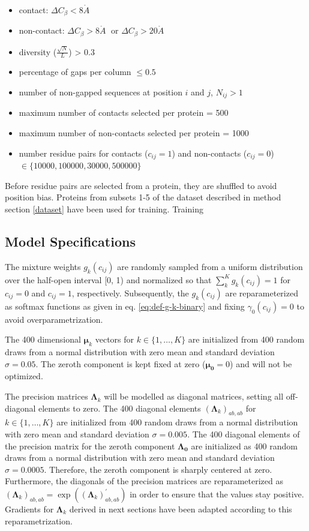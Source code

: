 \documentclass[11pt,a4paper,twoside]{book}
\providecommand{\tightlist}{%
  \setlength{\itemsep}{0pt}\setlength{\parskip}{0pt}}
\newcommand{\Cb}{C_\beta}
\newcommand{\eq}{\!=\!}
\newcommand{\Lk}{\mathbf{\Lambda}_k}
\newcommand{\muk}{\mathbf{\mu}_k}
\newcommand{\cij}{c_{ij}}
\newcommand{\angstrom}{\mathring{A} \;}
\theoremstyle{definition}
\theoremstyle{definition}
\theoremstyle{remark}
\begin{document}
\begin{itemize}
\tightlist
\item
  contact: \(\Delta\Cb <8 \angstrom\)
\item
  non-contact: \(\Delta\Cb >8 \angstrom\) or \(\Delta\Cb >20 \angstrom\)
\item
  diversity (\(\frac{\sqrt{N}}{L}\)) \textgreater{} 0.3
\item
  percentage of gaps per column \(\leq 0.5\)
\item
  number of non-gapped sequences at position \(i\) and \(j\),
  \(N_{ij} > 1\)
\item
  maximum number of contacts selected per protein = 500
\item
  maximum number of non-contacts selected per protein = 1000
\item
  number residue pairs for contacts (\(\cij \eq 1\)) and non-contacts
  (\(\cij \eq 0\)) \(\in \{10000, 100000, 30000, 500000 \}\)
\end{itemize}

Before residue pairs are selected from a protein, they are shuffled to
avoid position bias. Proteins from subsets 1-5 of the dataset described
in method section \ref{dataset} have been used for training. Training

\subsection{Model
Specifications}\label{model-specifications-training-hyperparmeters}

The mixture weights \(g_k(\cij)\) are randomly sampled from a uniform
distribution over the half-open interval {[}0, 1) and normalized so that
\(\sum_k^K g_k(\cij) = 1\) for \(\cij=0\) and \(\cij=1\), respectively.
Subsequently, the \(g_k(\cij)\) are reparameterized as softmax functions
as given in eq. \eqref{eq:def-g-k-binary} and fixing \(\gamma_0(\cij)=0\)
to avoid overparametrization.

The 400 dimensional \(\muk\) vectors for \(k \in \{1, \ldots, K\}\) are
initialized from 400 random draws from a normal distribution with zero
mean and standard deviation \(\sigma \eq 0.05\). The zeroth component is
kept fixed at zero (\(\mathbf{\mu_0} \eq 0\)) and will not be optimized.

The precision matrices \(\Lk\) will be modelled as diagonal matrices,
setting all off-diagonal elements to zero. The 400 diagonal elements
\((\Lk)_{ab, ab}\) for \(k \in \{1, \ldots, K\}\) are initialized from
400 random draws from a normal distribution with zero mean and standard
deviation \(\sigma \eq 0.005\). The 400 diagonal elements of the
precision matrix for the zeroth component \(\mathbf{\Lambda_0}\) are
initialized as 400 random draws from a normal distribution with zero
mean and standard deviation \(\sigma \eq 0.0005\). Therefore, the zeroth
component is sharply centered at zero. Furthermore, the diagonals of the
precision matrices are reparameterized as
\((\Lk)_{ab, ab} = \exp((\Lk)_{ab, ab}^{\prime})\) in order to ensure
that the values stay positive. Gradients for \(\Lk\) derived in next
sections have been adapted according to this reparametrization.
\end{document}
